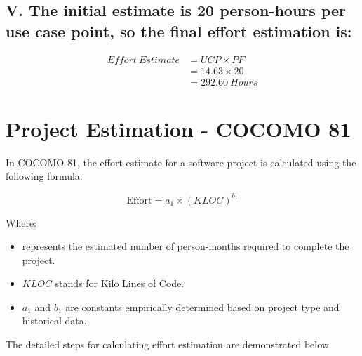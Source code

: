 \documentclass[english,12pt,a4paper]{report}
\begin{document}
	
	\subsection*{V. The initial estimate is 20 person-hours per use case point, so the final effort estimation is:}
	\begin{equation}
		\begin{aligned}
			Effort\ Estimate&= UCP \times PF \\
			&= 14.63 \times 20 \\
			&= 292.60\ Hours
		\end{aligned}
	\end{equation}
	
	
	\section{Project Estimation - COCOMO 81}
	In COCOMO 81, the effort estimate for a software project is calculated using the following formula:
	
	\begin{equation}
		\text{Effort} = a_1 \times (KLOC)^{b_1}
	\end{equation}
	
	Where:
	
	\begin{itemize}
		\item {} represents the estimated number of person-months required to complete the project.
		\item $KLOC$ stands for Kilo Lines of Code.
		\item $a_1$ and $b_1$ are constants empirically determined based on project type and historical data.
		
	\end{itemize}
	
	The detailed steps for calculating effort estimation are demonstrated below.
	
\end{document}
